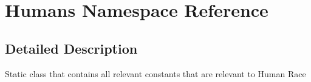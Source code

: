 \hypertarget{namespace_humans}{}\section{Humans Namespace Reference}
\label{namespace_humans}


\subsection{Detailed Description}
Static class that contains all relevant constants that are relevant to Human Race 
